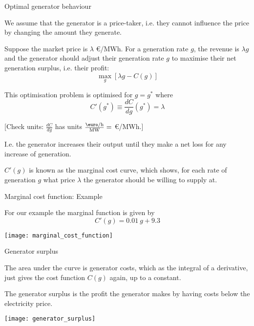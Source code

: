 \documentclass[10pt,aspectratio=169,dvipsnames]{beamer}
\def\l{\lambda}
\begin{document}
\begin{frame}{Optimal generator behaviour}

  We assume that the generator is a \alert{price-taker},
  i.e. they cannot influence the price by changing the amount they
  generate.

  Suppose the market price is $\lambda$ \euro/MWh. For a generation
  rate $g$, the revenue is $\l g$ and the generator should adjust their
generation rate $g$ to maximise their \alert{net generation surplus}, i.e. their profit:
  \begin{equation*}
    \max_g \left[ \l g - C(g) \right]
  \end{equation*}

  This optimisation problem is optimised for $g=g^*$ where
  \begin{equation*}
    C'(g^*) \equiv \frac{dC}{dg} (g^*) =  \l
  \end{equation*}

  [Check units: $\frac{dC}{dg}$ has units $\frac{\textrm{\euro/h}}{\textrm{MW}} = $ \euro/MWh.]

  I.e. the generator increases their output until they make a net loss for any increase of generation.

  $C'(g)$ is known as the \alert{marginal cost curve}, which shows,
  for each rate of generation $g$ what price $\l$ the generator should be
  willing to supply at.


\end{frame}



\begin{frame}{Marginal cost function: Example}

  For our example the marginal function is given by
  \begin{equation*}
    C'(g) = 0.01~g + 9.3
  \end{equation*}

  \centering
  \texttt{[image: marginal\_cost\_function]}

\end{frame}





\begin{frame}{Generator surplus}

  The area under the curve is generator costs, which as the integral
  of a derivative, just gives the cost function $C(g)$ again, up to a
  constant.


  The \alert{generator surplus} is the profit the generator makes by
  having costs below the electricity price.

  \centering
  \texttt{[image: generator\_surplus]}

\end{frame}
\end{document}
